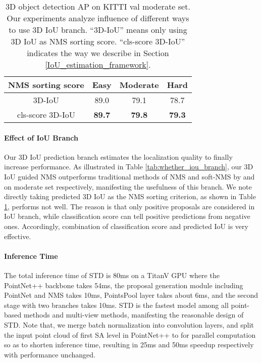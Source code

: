 \documentclass[10pt,twocolumn,letterpaper]{article}
\begin{document}
\begin{table}[t]
	\centering \addtolength{\tabcolsep}{-1pt}
	\footnotesize
	\begin{tabular}{|c|c|c|c|}
		\hline
		NMS sorting score & Easy & Moderate & Hard \\
		\hline
		3D-IoU & 89.0 & 79.1 & 78.7 \\
		cls-score  3D-IoU & \bf 89.7 & \bf 79.8 & \bf 79.3 \\
		\hline
	\end{tabular}\vspace{0.1cm}
	\caption{3D object detection AP on KITTI val moderate set. Our experiments analyze influence of different ways to use 3D IoU branch. ``3D-IoU'' means only using 3D IoU as NMS sorting score. ``cls-score  3D-IoU'' indicates the way we describe in Section \ref{IoU_estimation_framework}.\vspace{-0.1in}}
	\label{tab:way_of_iou_branch}
\end{table}

\vspace{-0.1in}
\paragraph{Effect of IoU Branch}
Our 3D IoU prediction branch estimates the localization quality to finally increase performance. As illustrated in Table \ref{tab:whether_iou_branch}, our 3D IoU guided NMS outperforms traditional methods of NMS and soft-NMS by  and  on moderate set respectively, manifesting the usefulness of this branch. We note directly taking predicted 3D IoU as the NMS sorting criterion, as shown in Table \ref{tab:way_of_iou_branch}, performs not well. The reason is that only positive proposals are considered in IoU branch, while classification score can tell positive predictions from negative ones. Accordingly, combination of classification score and predicted IoU is very effective.

\vspace{-0.1in}
\paragraph{Inference Time}
The total inference time of STD is 80ms on a TitanV GPU where the PointNet++ backbone takes 54ms, the proposal generation module including PointNet and NMS takes 10ms, PointsPool layer takes about 6ms, and the second stage with two branches takes 10ms. STD is the fastest model among all point-based methods and multi-view methods, manifesting the reasonable design of STD. Note that, we merge batch normalization into convolution layers, and split the input point cloud of first SA level  in PointNet++ to  for parallel computation so as to shorten inference time, resulting in 25ms and 50ms speedup respectively with performance unchanged.
\end{document}
